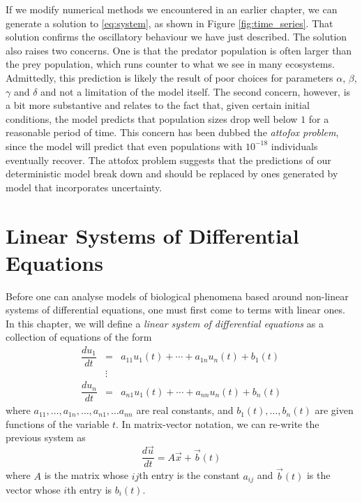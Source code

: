 \documentclass[../book.tex]{subfiles}
\begin{document}
If we modify numerical methods we encountered in an earlier chapter, we can generate a solution to \eqref{eq:system}, as shown in Figure \ref{fig:time_series}. That solution confirms the oscillatory behaviour we have just described. The solution also raises two concerns. One is that the predator population is often larger than the prey population, which runs counter to what we see in many ecosystems. Admittedly, this prediction is likely the result of poor choices for parameters \(\alpha\), \(\beta\), \(\gamma\) and \(\delta\) and not a limitation of the model itself. The second concern, however, is a bit more substantive and relates to the fact that, given certain initial conditions, the model predicts that population sizes drop well below \(1\) for a reasonable period of time. This concern has been dubbed the \emph{attofox problem}, since the model will predict that even populations with \(10^{-18}\) individuals eventually recover. The attofox problem suggests that the predictions of our deterministic model break down and should be replaced by ones generated by model that incorporates uncertainty.

\section{Linear Systems of Differential Equations}
Before one can analyse models of biological phenomena based around non-linear systems of differential equations, one must first come to terms with linear ones. In this chapter, we will define a \emph{linear system of differential equations} as a collection of equations of the form
\begin{equation}\label{eq:sys-6}
\begin{array}{ccc}
  \dfrac{du_1}{dt} 
              &=&
              a_{11} u_1(t) + \cdots + a_{1n} u_n(t) 
              + 
              b_1(t) 
              \\
              &\vdots & 
              \\
              \dfrac{du_n}{dt}
              &=&
              a_{n1} u_1(t) + \cdots + a_{nn} u_n(t) 
              + b_n(t) 	
\end{array}
\end{equation}
where \(a_{11}, \ldots, a_{1n}, \ldots, a_{n1}, \ldots a_{nn}\) are real constants, and \(b_1(t), \ldots, b_n(t)\) are given functions of the variable \(t\). In matrix-vector notation, we can re-write the previous system as
\begin{equation}\label{eq:sys-7}
\frac{d\vec{u}}{dt} = A \vec{x} + \vec{b}(t)
\end{equation}
where \(A\) is the matrix whose \(ij\)th entry is the constant \(a_{ij}\) and \(\vec{b}(t)\) is the vector whose \(i\)th entry is \(b_i(t)\).
\end{document}
